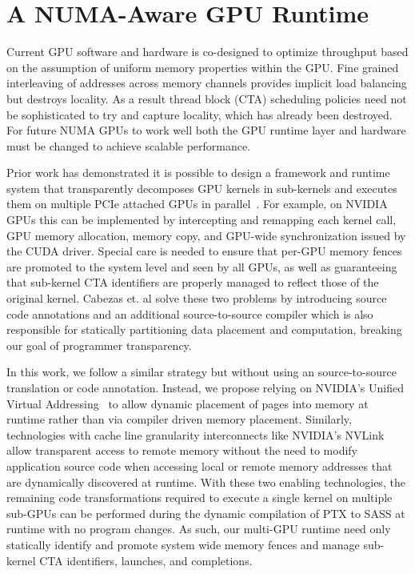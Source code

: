 \section{A NUMA-Aware GPU Runtime}

Current GPU software and hardware is co-designed to optimize 
throughput based on the assumption of uniform memory properties 
within the GPU. Fine grained interleaving of addresses across
memory channels provides implicit load balancing but destroys 
locality.  As a result thread block (CTA) scheduling policies need not 
be sophisticated to try and capture locality, which has already been
destroyed.  For future NUMA GPUs to work well both the GPU runtime layer and 
hardware must be changed to achieve scalable performance.

Prior work has demonstrated it is possible to design a framework and runtime 
system that transparently decomposes GPU kernels in sub-kernels and executes 
them on multiple PCIe attached GPUs in parallel~\cite{Cabezas2015}. For example, on NVIDIA GPUs 
this can be implemented by intercepting and remapping each kernel call, GPU 
memory allocation, memory copy, and GPU-wide synchronization issued by the CUDA 
driver. Special care is needed to ensure that per-GPU memory fences are promoted to 
the system level and seen by all GPUs, as well as guaranteeing that sub-kernel CTA 
identifiers are properly managed to reflect those of the original kernel. Cabezas
et. al solve these two problems by introducing source code 
annotations and an additional source-to-source compiler which is also 
responsible for statically partitioning data placement and computation, breaking
our goal of programmer transparency.

In this work, we follow a similar strategy but without using an source-to-source
translation or code annotation. Instead, we propose relying on NVIDIA's Unified Virtual 
Addressing~\cite{UVM} to allow dynamic placement of pages into memory at
runtime rather than via compiler driven memory placement.  Similarly, technologies with
cache line granularity interconnects like NVIDIA's NVLink~\cite{NVLINK} allow
transparent access to remote memory without the need to modify application
source code when accessing local or remote memory addresses that are dynamically
discovered at runtime. With these two enabling technologies, the remaining code
transformations required to execute a single kernel on multiple sub-GPUs can
be performed during the dynamic compilation of PTX to SASS at runtime with no program
changes.  As such, our multi-GPU runtime need only statically identify and promote 
system wide memory fences and manage sub-kernel CTA identifiers, launches, and completions.

